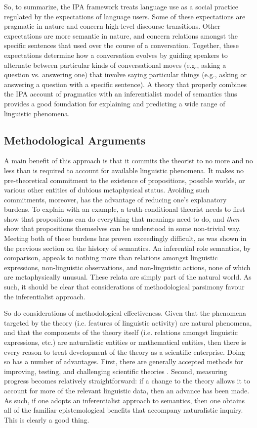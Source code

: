 So, to summarize, the IPA framework treats language use as a social practice regulated by the expectations of language users. Some of these expectations are pragmatic in nature and concern high-level discourse transitions. Other expectations are more semantic in nature, and concern relations amongst the specific sentences that used over the course of a conversation. Together, these expectations determine how a conversation evolves by guiding speakers to alternate between particular kinds of conversational moves (e.g., asking a question vs. answering one) that involve saying particular things (e.g., asking or answering a question with a specific sentence). A theory that properly combines the IPA account of pragmatics with an inferentialist model of semantics thus provides a good foundation for explaining and predicting a wide range of linguistic phenomena. 

\subsection{Methodological Arguments}

A main benefit of this approach is that it commits the theorist to no more and no less than is required to account for available linguistic phenomena. It makes no pre-theoretical commitment to the existence of propositions, possible worlds, or various other entities of dubious metaphysical status. Avoiding such commitments, moreover, has the advantage of reducing one's explanatory burdens. To explain with an example, a truth-conditional theorist needs to first show that propositions can do everything that meanings need to do, and \textit{then} show that propositions themselves can be understood in some non-trivial way. Meeting both of these burdens has proven exceedingly difficult, as was shown in the previous section on the history of semantics. An inferential role semantics, by comparison, appeals to nothing more than relations amongst linguistic expressions, non-linguistic observations, and non-linguistic actions, none of which are metaphysically unusual. These relata are simply part of the natural world. As such, it should be clear that considerations of methodological parsimony favour the inferentialist approach. 

So do considerations of methodological effectiveness. Given that the phenomena targeted by the theory (i.e. features of linguistic activity) are natural phenomena, and that the components of the theory itself (i.e. relations amongst linguistic expressions, etc.) are naturalistic entities or mathematical entities, then there is every reason to treat development of the theory as a scientific enterprise. Doing so has a number of advantages. First, there are generally accepted methods for improving, testing, and challenging scientific theories \citep{GodfreySmith:2002}. Second, measuring progress becomes relatively straightforward: if a change to the theory allows it to account for more of the relevant linguistic data, then an advance has been made. As such, if one adopts an inferentialist approach to semantics, then one obtains all of the familiar epistemological benefits that accompany naturalistic inquiry. This is clearly a good thing.

